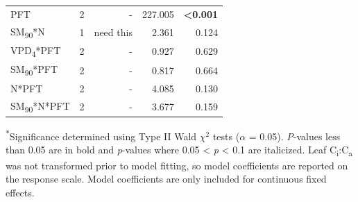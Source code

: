 \begin{table}
\begin{tabular}{p{6cm}p{0.5cm}p{2cm}p{1.5cm}p{1.5cm}}
            PFT
            & \multicolumn{1}{r}{2}
            & \multicolumn{1}{r}{-}
            & \multicolumn{1}{r}{227.005}
            & \multicolumn{1}{r}{\textbf{<0.001}}
            \\

            SM\textsubscript{90}*N
            & \multicolumn{1}{r}{1}
            & \multicolumn{1}{r}{need this}
            & \multicolumn{1}{r}{2.361}
            & \multicolumn{1}{r}{0.124}
            \\

            VPD\textsubscript{4}*PFT
            & \multicolumn{1}{r}{2}
            & \multicolumn{1}{r}{-}
            & \multicolumn{1}{r}{0.927}
            & \multicolumn{1}{r}{0.629}
            \\

            SM\textsubscript{90}*PFT
            & \multicolumn{1}{r}{2}
            & \multicolumn{1}{r}{-}
            & \multicolumn{1}{r}{0.817}
            & \multicolumn{1}{r}{0.664}
            \\

            N*PFT
            & \multicolumn{1}{r}{2}
            & \multicolumn{1}{r}{-}
            & \multicolumn{1}{r}{4.085}
            & \multicolumn{1}{r}{0.130}
            \\

            SM\textsubscript{90}*N*PFT
            & \multicolumn{1}{r}{2}
            & \multicolumn{1}{r}{-}
            & \multicolumn{1}{r}{3.677}
            & \multicolumn{1}{r}{0.159}
            \\
            \hline
        \end{tabular}%
    \label{tab:table4.3}
\end{table}
\noindent \textsuperscript{$*$}Significance determined using Type II Wald $\chi^{2}$ tests ($\alpha$ = 0.05). \textit{P}-values less than 0.05 are in bold and \textit{p}-values where 0.05 < \textit{p} < 0.1 are italicized. Leaf C\textsubscript{i}:C\textsubscript{a} was not transformed prior to model fitting, so model coefficients are reported on the response scale. Model coefficients are only included for continuous fixed effects.
\clearpage

